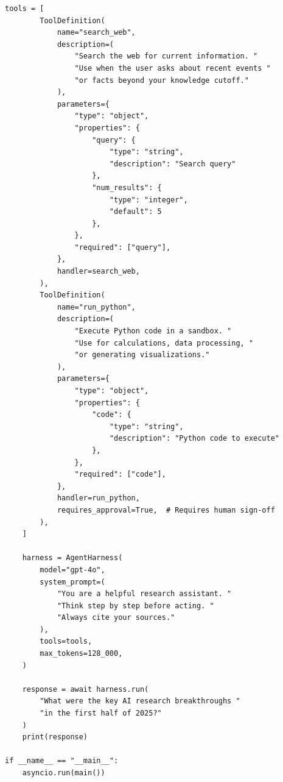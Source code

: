 \begin{lstlisting}[style=pythonstyle, caption={Production Agent Harness -- Core Implementation}]
    tools = [
        ToolDefinition(
            name="search_web",
            description=(
                "Search the web for current information. "
                "Use when the user asks about recent events "
                "or facts beyond your knowledge cutoff."
            ),
            parameters={
                "type": "object",
                "properties": {
                    "query": {
                        "type": "string",
                        "description": "Search query"
                    },
                    "num_results": {
                        "type": "integer",
                        "default": 5
                    },
                },
                "required": ["query"],
            },
            handler=search_web,
        ),
        ToolDefinition(
            name="run_python",
            description=(
                "Execute Python code in a sandbox. "
                "Use for calculations, data processing, "
                "or generating visualizations."
            ),
            parameters={
                "type": "object",
                "properties": {
                    "code": {
                        "type": "string",
                        "description": "Python code to execute"
                    },
                },
                "required": ["code"],
            },
            handler=run_python,
            requires_approval=True,  # Requires human sign-off
        ),
    ]

    harness = AgentHarness(
        model="gpt-4o",
        system_prompt=(
            "You are a helpful research assistant. "
            "Think step by step before acting. "
            "Always cite your sources."
        ),
        tools=tools,
        max_tokens=128_000,
    )

    response = await harness.run(
        "What were the key AI research breakthroughs "
        "in the first half of 2025?"
    )
    print(response)

if __name__ == "__main__":
    asyncio.run(main())
\end{lstlisting}

